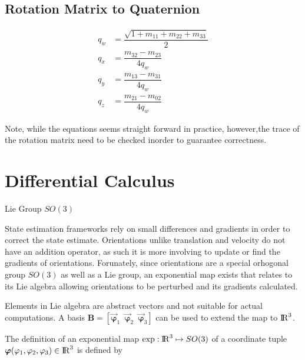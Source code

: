 \subsection{Rotation Matrix to Quaternion}

\begin{align}
  q_w &= \dfrac{\sqrt{1 + m_{11} + m_{22} + m_{33}}}{2} \\
  q_x &= \dfrac{m_{32} - m_{23}}{4 q_w} \\
  q_y &= \dfrac{m_{13} - m_{31}}{4 q_w} \\
  q_z &= \dfrac{m_{21} - m_{02}}{4 q_w}
\end{align}

Note, while the equations seems straight forward in practice, however,the trace
of the rotation matrix need to be checked inorder to guarantee correctness.




\section{Differential Calculus}

Lie Group $SO(3)$
\begin{itemize}
  \item{Not a vector space}
  \item{Has no addition operator
  \item{Has no subtraction operator
\end{itemize}

State estimation frameworks rely on small differences and gradients in order to
correct the state estimate. Orientations unlike translation and velocity do not
have an addition operator, as such it is more involving to update or
find the gradients of orientations. Forunately, since orientations are a
special orhogonal group $SO(3)$ as well as a Lie group, an exponential map
exists that relates to its Lie algebra allowing orientations to be perturbed
and its gradients calculated.

Elements in Lie algebra are abstract vectors and not suitable for actual
computations. A basis $\mathbf{B} = [\vec{\boldsymbol{\varphi}}_{1} \enspace
\vec{\boldsymbol{\varphi}}_{2} \enspace \vec{\boldsymbol{\varphi}}_{3}]$
can be used to extend the map to ${\rm I\!R}^{3}$. 

The definition of an exponential map $\text{exp} : {\rm I\!R}^{3} \mapsto SO(3)$ of a
coordinate tuple $\boldsymbol{\varphi} (\varphi_1, \varphi_2, \varphi_3) \in
{\rm I\!R}^{3}$ is defined by


